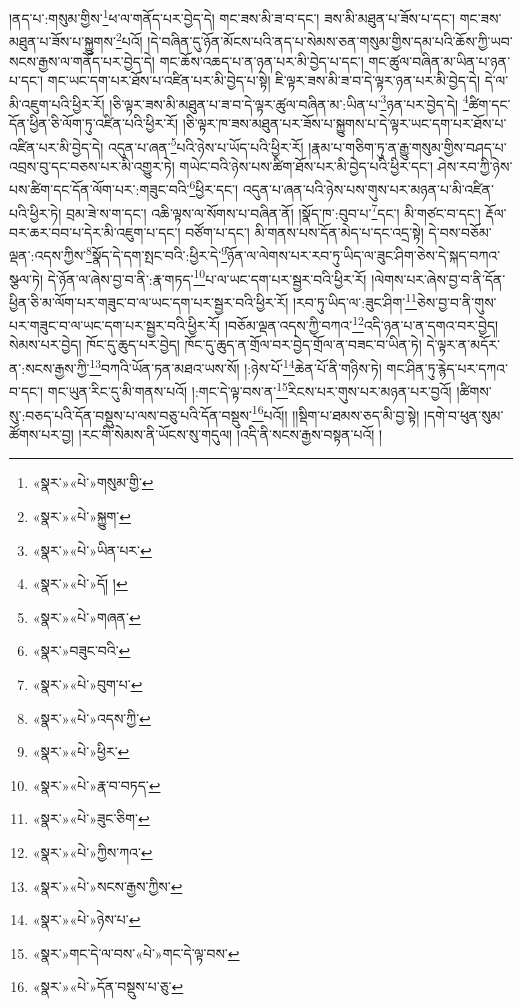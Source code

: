 །ནད་པ་:གསུམ་གྱིས་\footnote{«སྣར་»«པེ་»གསུམ་གྱི་}ཕ་ལ་གནོད་པར་བྱེད་དེ། གང་ཟས་མི་ཟ་བ་དང་། ཟས་མི་མཐུན་པ་ཟོས་པ་དང་། གང་ཟས་མཐུན་པ་ཟོས་པ་སྐྱུགས་\footnote{«སྣར་»«པེ་»སྐྱུག་}པའོ། །དེ་བཞིན་དུ་ཉོན་མོངས་པའི་ནད་པ་སེམས་ཅན་གསུམ་གྱིས་དམ་པའི་ཆོས་ཀྱི་ཡབ་སངས་རྒྱས་ལ་གནོད་པར་བྱེད་དེ། གང་ཆོས་འཆད་པ་ན་ཉན་པར་མི་བྱེད་པ་དང་། གང་ཚུལ་བཞིན་མ་ཡིན་པ་ཉན་པ་དང་། གང་ཡང་དག་པར་ཐོས་པ་འཛིན་པར་མི་བྱེད་པ་སྟེ། ཇི་ལྟར་ཟས་མི་ཟ་བ་དེ་ལྟར་ཉན་པར་མི་བྱེད་དེ། དེ་ལ་མི་འཇུག་པའི་ཕྱིར་རོ། །ཅི་ལྟར་ཟས་མི་མཐུན་པ་ཟ་བ་དེ་ལྟར་ཚུལ་བཞིན་མ་:ཡིན་པ་\footnote{«སྣར་»«པེ་»ཡིན་པར་}ཉན་པར་བྱེད་དེ། \footnote{«སྣར་»«པེ་»དོ། ། }ཚིག་དང་དོན་ཕྱིན་ཅི་ལོག་ཏུ་འཛིན་པའི་ཕྱིར་རོ། །ཅི་ལྟར་ཁ་ཟས་མཐུན་པར་ཟོས་པ་སྐྱུགས་པ་དེ་ལྟར་ཡང་དག་པར་ཐོས་པ་འཛིན་པར་མི་བྱེད་དེ། འདུན་པ་ཞན་\footnote{«སྣར་»«པེ་»གཞན་}པའི་ཉེས་པ་ཡོད་པའི་ཕྱིར་རོ། །རྣམ་པ་གཅིག་ཏུ་ན་རྒྱུ་གསུམ་གྱིས་བཤད་པ་འབྲས་བུ་དང་བཅས་པར་མི་འགྱུར་ཏེ། གཡེང་བའི་ཉེས་པས་ཚིག་ཐོས་པར་མི་བྱེད་པའི་ཕྱིར་དང་། ཤེས་རབ་ཀྱི་ཉེས་པས་ཚིག་དང་དོན་ལོག་པར་:གཟུང་བའི་\footnote{«སྣར་»བཟུང་བའི་}ཕྱིར་དང་། འདུན་པ་ཞན་པའི་ཉེས་པས་གུས་པར་མཉན་པ་མི་འཛིན་པའི་ཕྱིར་ཏེ། བྲམ་ཟེ་ས་ག་དང་། འཆི་ལྟས་ལ་སོགས་པ་བཞིན་ནོ། །སྣོད་ཁ་:བུབ་པ་\footnote{«སྣར་»«པེ་»བུག་པ་}དང་། མི་གཙང་བ་དང་། རྡོལ་བར་ཆར་བབ་པ་དེར་མི་འཇུག་པ་དང་། བཙོག་པ་དང་། མི་གནས་པས་དོན་མེད་པ་དང་འདྲ་སྟེ། དེ་བས་བཅོམ་ལྡན་:འདས་ཀྱིས་\footnote{«སྣར་»«པེ་»འདས་ཀྱི་}སྣོད་དེ་དག་སྤང་བའི་:ཕྱིར་དེ་\footnote{«སྣར་»«པེ་»ཕྱིར་}ཉོན་ལ་ལེགས་པར་རབ་ཏུ་ཡིད་ལ་ཟུང་ཤིག་ཅེས་དེ་སྐད་བཀའ་སྩལ་ཏེ། དེ་ཉོན་ལ་ཞེས་བྱ་བ་ནི་:རྣ་གཏད་\footnote{«སྣར་»«པེ་»རྣ་བ་བཏད་}པ་ལ་ཡང་དག་པར་སྦྱར་བའི་ཕྱིར་རོ། །ལེགས་པར་ཞེས་བྱ་བ་ནི་དོན་ཕྱིན་ཅི་མ་ལོག་པར་གཟུང་བ་ལ་ཡང་དག་པར་སྦྱར་བའི་ཕྱིར་རོ། །རབ་ཏུ་ཡིད་ལ་:ཟུང་ཤིག་\footnote{«སྣར་»«པེ་»ཟུང་ཅིག་}ཅེས་བྱ་བ་ནི་གུས་པར་གཟུང་བ་ལ་ཡང་དག་པར་སྦྱར་བའི་ཕྱིར་རོ། །བཅོམ་ལྡན་འདས་ཀྱི་བཀའ་\footnote{«སྣར་»«པེ་»ཀྱིས་ཀའ་}འདི་ཉན་པ་ན་དགའ་བར་བྱེད། སེམས་པར་བྱེད། ཁོང་དུ་ཆུད་པར་བྱེད། ཁོང་དུ་ཆུད་ན་གྲོལ་བར་བྱེད་གྲོལ་ན་བཟང་བ་ཡིན་ཏེ། དེ་ལྟར་ན་མདོར་ན་:སངས་རྒྱས་ཀྱི་\footnote{«སྣར་»«པེ་»སངས་རྒྱས་ཀྱིས་}བཀའི་ཡོན་ཏན་མཐའ་ཡས་སོ། །:ཉེས་པོ་\footnote{«སྣར་»«པེ་»ཉེས་པ་}ཆེན་པོ་ནི་གཉིས་ཏེ། གང་ཤིན་ཏུ་རྙེད་པར་དཀའ་བ་དང་། གང་ཡུན་རིང་དུ་མི་གནས་པའོ། །:གང་དེ་ལྟ་བས་ན་\footnote{«སྣར་»གང་དེ་ལ་བས་«པེ་»གང་དེ་ལྟ་བས་}རིངས་པར་གུས་པར་མཉན་པར་བྱའོ། །ཚིགས་སུ་:བཅད་པའི་དོན་བསྡུས་པ་ལས་བཅུ་པའི་དོན་བསྡུས་\footnote{«སྣར་»«པེ་»དོན་བསྡུས་པ་ཅུ་}པའོ།། །།སྡིག་པ་ཐམས་ཅད་མི་བྱ་སྟེ། །དགེ་བ་ཕུན་སུམ་ཚོགས་པར་བྱ། །རང་གི་སེམས་ནི་ཡོངས་སུ་གདུལ། །འདི་ནི་སངས་རྒྱས་བསྟན་པའོ། །
